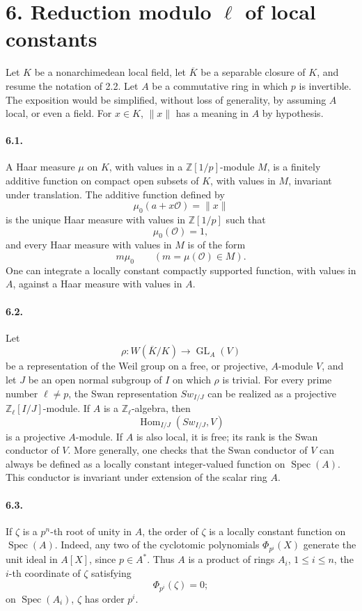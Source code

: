 \documentclass[10pt]{article}
\newcommand{\GL}{\operatorname{GL}}
\newcommand{\Hom}{\operatorname{Hom}}
\newcommand{\Spec}{\operatorname{Spec}}
\providecommand{\Spec}{\operatorname{Spec}}
\providecommand{\Hom}{\operatorname{Hom}}
\providecommand{\GL}{\operatorname{GL}}
\providecommand{\GL}{\operatorname{GL}}
\providecommand{\Hom}{\operatorname{Hom}}
\providecommand{\Spec}{\operatorname{Spec}}
\providecommand{\Spec}{\operatorname{Spec}}
\providecommand{\Hom}{\operatorname{Hom}}
\begin{document}
\section*{6. Reduction modulo \(\ell\) of local constants}

Let \(K\) be a nonarchimedean local field, let \(\overline K\) be a separable closure of \(K\), and resume the notation of 2.2. Let \(A\) be a commutative ring in which \(p\) is invertible. The exposition would be simplified, without loss of generality, by assuming \(A\) local, or even a field. For \(x\in K\), \(\|x\|\) has a meaning in \(A\) by hypothesis.

\paragraph{6.1.} A Haar measure \(\mu\) on \(K\), with values in a \(\mathbb Z[1/p]\)-module \(M\), is a finitely additive function on compact open subsets of \(K\), with values in \(M\), invariant under translation. The additive function defined by
\[
\mu_0(a+x\mathcal O)=\|x\|
\]
is the unique Haar measure with values in \(\mathbb Z[1/p]\) such that
\[
\mu_0(\mathcal O)=1,
\]
and every Haar measure with values in \(M\) is of the form
\[
m\mu_0\qquad(m=\mu(\mathcal O)\in M).
\]
One can integrate a locally constant compactly supported function, with values in \(A\), against a Haar measure with values in \(A\).

\paragraph{6.2.} Let
\[
\rho:W(\overline K/K)\longrightarrow\GL_A(V)
\]
be a representation of the Weil group on a free, or projective, \(A\)-module \(V\), and let \(J\) be an open normal subgroup of \(I\) on which \(\rho\) is trivial. For every prime number \(\ell\ne p\), the Swan representation \(Sw_{I/J}\) can be realized as a projective \(\mathbb Z_\ell[I/J]\)-module. If \(A\) is a \(\mathbb Z_\ell\)-algebra, then
\[
\Hom_{I/J}(Sw_{I/J},V)
\]
is a projective \(A\)-module. If \(A\) is also local, it is free; its rank is the Swan conductor of \(V\). More generally, one checks that the Swan conductor of \(V\) can always be defined as a locally constant integer-valued function on \(\Spec(A)\). This conductor is invariant under extension of the scalar ring \(A\).

\paragraph{6.3.} If \(\zeta\) is a \(p^n\)-th root of unity in \(A\), the order of \(\zeta\) is a locally constant function on \(\Spec(A)\). Indeed, any two of the cyclotomic polynomials \(\Phi_{p^i}(X)\) generate the unit ideal in \(A[X]\), since \(p\in A^*\). Thus \(A\) is a product of rings \(A_i\), \(1\le i\le n\), the \(i\)-th coordinate of \(\zeta\) satisfying
\[
\Phi_{p^i}(\zeta)=0;
\]
on \(\Spec(A_i)\), \(\zeta\) has order \(p^i\).
\end{document}

